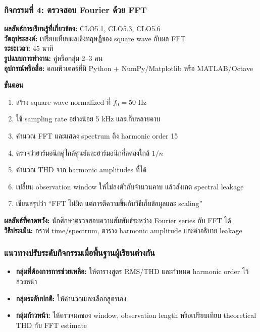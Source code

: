 \subsubsection{กิจกรรมที่ 4: ตรวจสอบ Fourier ด้วย FFT}

\textbf{ผลลัพธ์การเรียนรู้ที่เกี่ยวข้อง:} CLO5.1, CLO5.3, CLO5.6 \\
\textbf{วัตถุประสงค์:} เปรียบเทียบผลเชิงทฤษฎีของ square wave กับผล FFT \\
\textbf{ระยะเวลา:} 45 นาที \\
\textbf{รูปแบบการทำงาน:} คู่หรือกลุ่ม 2–3 คน \\
\textbf{อุปกรณ์หรือสื่อ:} คอมพิวเตอร์ที่มี Python + NumPy/Matplotlib หรือ MATLAB/Octave

\textbf{ขั้นตอน}

\begin{enumerate}
    \item สร้าง square wave normalized ที่ $f_0=50$ Hz
    \item ใช้ sampling rate อย่างน้อย 5 kHz และเก็บหลายคาบ
    \item คำนวณ FFT และแสดง spectrum ถึง harmonic order 15
    \item ตรวจว่าฮาร์มอนิกคู่ใกล้ศูนย์และฮาร์มอนิกคี่ลดลงใกล้ $1/n$
    \item คำนวณ THD จาก harmonic amplitudes ที่ได้
    \item เปลี่ยน observation window ให้ไม่ลงตัวกับจำนวนคาบ แล้วสังเกต spectral leakage
    \item เขียนสรุปว่า “FFT ไม่ผิด แต่การตีความขึ้นกับวิธีเก็บข้อมูลและ scaling”
\end{enumerate}

\textbf{ผลลัพธ์ที่คาดหวัง:} นักศึกษาตรวจสอบความสัมพันธ์ระหว่าง Fourier series กับ FFT ได้ \\
\textbf{วิธีประเมิน:} กราฟ time/spectrum, ตาราง harmonic amplitude และคำอธิบาย leakage

\subsubsection{แนวทางปรับระดับกิจกรรมเมื่อพื้นฐานผู้เรียนต่างกัน}

\begin{itemize}
    \item \textbf{กลุ่มที่ต้องการการช่วยเหลือ:} ให้ตารางสูตร RMS/THD และกำหนด harmonic order ไว้ล่วงหน้า
    \item \textbf{กลุ่มระดับปกติ:} ให้คำนวณและเลือกสูตรเอง
    \item \textbf{กลุ่มก้าวหน้า:} ให้ตรวจผลของ window, observation length หรือเปรียบเทียบ theoretical THD กับ FFT estimate
\end{itemize}

